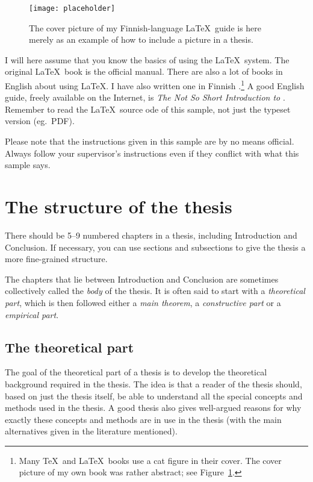 \documentclass[utf8,english]{gradu3}
\begin{document}
\begin{figure}[h]\centering
  \texttt{[image: placeholder]}
  \caption[The cover picture of my Finnish-language \LaTeX\ guide
  \parencite{kaijanaho03:_latex_ams_latex}]{The cover picture of my
    Finnish-language \LaTeX\
    guide \parencite{kaijanaho03:_latex_ams_latex} is here merely as
    an example of how to include a picture in a thesis.}
  \label{fig:opus-kissa}
\end{figure}

I will here assume that you know the basics of using the \LaTeX\
system.  The original \LaTeX\ book \parencite{lamport94:_latex} is the
official manual.  There are also a lot of books in English about using
\LaTeX.  I have also written one in
Finnish \parencite{kaijanaho03:_latex_ams_latex}.\footnote{Many \TeX\
  and \LaTeX\ books use a cat figure in their cover.  The cover
  picture of my own book was rather abstract; see
  Figure~\ref{fig:opus-kissa}.}  A good English guide, freely
available on the Internet, is \textit{The Not So Short Introduction to
  \LaTeXe} \parencite{oetiker:_not_so_short_introd_latex}.  Remember
to read the \LaTeX\ source ode of this sample, not just the typeset
version (eg.~PDF).

Please note that the instructions given in this sample are by no means
official.  Always follow your supervisor's instructions even if they
conflict with what this sample says.


\chapter{The structure of the thesis}

There should be 5--9 numbered chapters in a thesis, including
Introduction and Conclusion.  If necessary, you can use sections
and subsections to give the thesis a more fine-grained structure.

The chapters that lie between Introduction and Conclusion are
sometimes collectively called the \textit{body} of the thesis.  It is
often said to start with a \textit{theoretical part}, which is then
followed either a \textit{main theorem}, a \textit{constructive part}
or a \textit{empirical part}.


\section{The theoretical part}

The goal of the theoretical part of a thesis is to develop the
theoretical background required in the thesis.  The idea is that a
reader of the thesis should, based on just the thesis itself, be able
to understand all the special concepts and methods used in the thesis.
A good thesis also gives well-argued reasons for why exactly these
concepts and methods are in use in the thesis (with the main
alternatives given in the literature mentioned).
\end{document}
